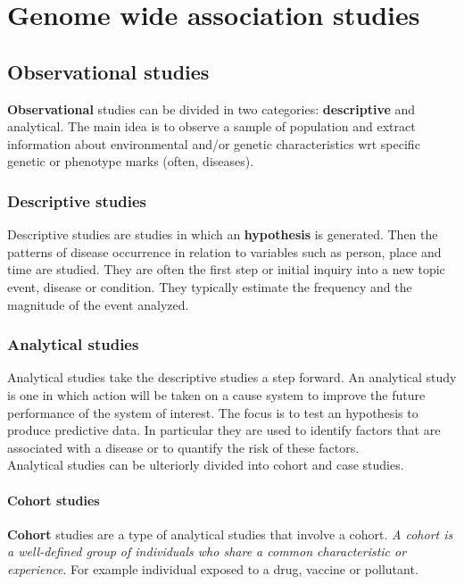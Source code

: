 \graphicspath{{chapters/08/images8/}}
\chapter{Genome wide association studies}

\section{Observational studies}
\textbf{Observational} studies can be divided in two categories: \textbf{descriptive} and analytical.
The main idea is to observe a sample of population and extract information about environmental and/or genetic characteristics wrt specific genetic or phenotype marks (often, diseases).

	\subsection{Descriptive studies}
	Descriptive studies are studies in which an \textbf{hypothesis} is generated.
	Then the patterns of disease occurrence in relation to variables such as person, place and time are studied.
	They are often the first step or initial inquiry into a new topic event, disease or condition.
	They typically estimate the frequency and the magnitude of the event analyzed.

	\subsection{Analytical studies}
	Analytical studies take the descriptive studies a step forward.
	An analytical study is one in which action will be taken on a cause system to improve the future performance of the system of interest.
	The focus is to test an hypothesis to produce predictive data.
	In particular they are used to identify factors that are associated with a disease or to quantify the risk of these factors.
\\
Analytical studies can be ulteriorly divided into cohort and case studies.
	
	\subsubsection{Cohort studies}
	\textbf{Cohort} studies are a type of analytical studies that involve a cohort.
	\textit{A cohort is a well-defined group of individuals who share a common characteristic or experience}.
	For example individual exposed to a drug, vaccine or pollutant.


